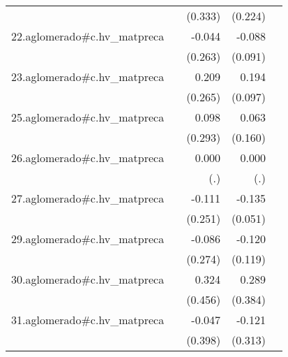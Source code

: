 {\begin{longtable}{l*{4}{D{.}{.}{-1}}}
            &                     &     (0.333)         &     (0.224)         &                     \\
\addlinespace
22.aglomerado#c.hv\_matpreca&                     &      -0.044         &      -0.088         &                     \\
            &                     &     (0.263)         &     (0.091)         &                     \\
\addlinespace
23.aglomerado#c.hv\_matpreca&                     &       0.209         &       0.194\sym{*}  &                     \\
            &                     &     (0.265)         &     (0.097)         &                     \\
\addlinespace
25.aglomerado#c.hv\_matpreca&                     &       0.098         &       0.063         &                     \\
            &                     &     (0.293)         &     (0.160)         &                     \\
\addlinespace
26.aglomerado#c.hv\_matpreca&                     &       0.000         &       0.000         &                     \\
            &                     &         (.)         &         (.)         &                     \\
\addlinespace
27.aglomerado#c.hv\_matpreca&                     &      -0.111         &      -0.135\sym{**} &                     \\
            &                     &     (0.251)         &     (0.051)         &                     \\
\addlinespace
29.aglomerado#c.hv\_matpreca&                     &      -0.086         &      -0.120         &                     \\
            &                     &     (0.274)         &     (0.119)         &                     \\
\addlinespace
30.aglomerado#c.hv\_matpreca&                     &       0.324         &       0.289         &                     \\
            &                     &     (0.456)         &     (0.384)         &                     \\
\addlinespace
31.aglomerado#c.hv\_matpreca&                     &      -0.047         &      -0.121         &                     \\
            &                     &     (0.398)         &     (0.313)         &                     \\

\end{longtable}}
